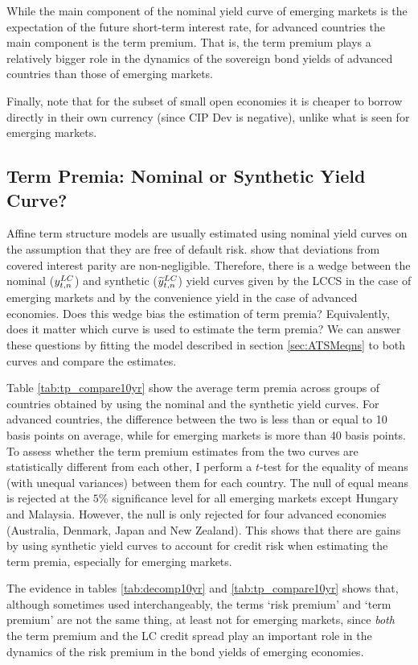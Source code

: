 {While the main component of the nominal yield curve of emerging markets is the expectation of the future short-term interest rate, for advanced countries the main component is the term premium. That is, the term premium plays a relatively bigger role in the dynamics of the sovereign bond yields of advanced countries than those of emerging markets.

Finally, note that for the subset of small open economies it is cheaper to borrow directly in their own currency (since CIP Dev is negative), unlike what is seen for emerging markets.

\subsection{Term Premia: Nominal or Synthetic Yield Curve?}
Affine term structure models are usually estimated using nominal yield curves on the assumption that they are free of default risk. \cite{DuTepperVerdelhan:2018} show that deviations from covered interest parity are non-negligible. Therefore, there is a wedge between the nominal ($y_{t,n} ^{LC}$) and synthetic ($\widetilde{y}_{t,n} ^{LC}$) yield curves given by the LCCS in the case of emerging markets and by the convenience yield in the case of advanced economies. Does this wedge bias the estimation of term premia? Equivalently, does it matter which curve is used to estimate the term premia? We can answer these questions by fitting the model described in section \ref{sec:ATSMeqns} to both curves and compare the estimates.

Table \ref{tab:tp_compare10yr} show the average term premia across groups of countries obtained by using the nominal and the synthetic yield curves. For advanced countries, the difference between the two is less than or equal to 10 basis points on average, while for emerging markets is more than 40 basis points. To assess whether the term premium estimates from the two curves are statistically different from each other, I perform a $t$-test for the equality of means (with unequal variances) between them for each country. The null of equal means is rejected at the $5$\% significance level for all emerging markets except Hungary and Malaysia. However, the null is only rejected for four advanced economies (Australia, Denmark, Japan and New Zealand). This shows that there are gains by using synthetic yield curves to account for credit risk when estimating the term premia, especially for emerging markets.
	

The evidence in tables \ref{tab:decomp10yr} and \ref{tab:tp_compare10yr} shows that, although sometimes used interchangeably, the terms `risk premium' and `term premium' are not the same thing, at least not for emerging markets, since \textit{both} the term premium and the LC credit spread play an important role in the dynamics of the risk premium in the bond yields of emerging economies.

}
